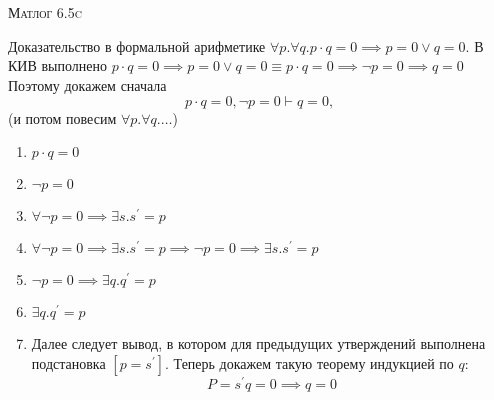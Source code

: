 \documentclass[10pt]{article}
\begin{document}
\def\chap#1#2{\ \\ {\large\bf#1 \ | \ \tt\scshape#2} \par}

\ \vspace{-1cm}

{\bf
\ \\
\Large\centerline{\scshape Матлог 6.5c}
}\normalsize



Доказательство в формальной арифметике $\forall p. \forall q. p\cdot q = 0 \implies p = 0 \lor q = 0$.
В КИВ выполнено $p\cdot q = 0 \implies p = 0 \lor q = 0 \equiv p \cdot q = 0 \implies \neg p = 0 \implies q = 0$
Поэтому докажем сначала 
\[ p \cdot q = 0, \neg p = 0 \vdash q = 0,\]
(и потом повесим $\forall p. \forall q. \ldots$)

\begin{enumerate}
    \item $p\cdot q = 0$
    \item $\neg p = 0$
    \item $\forall \neg p = 0 \implies \exists s. s^\prime = p$
    \item $\forall \neg p = 0 \implies \exists s. s^\prime = p \implies \neg p = 0 \implies \exists s. s^\prime = p$
    \item $\neg p = 0 \implies \exists q. q^\prime = p$
    \item $\exists q. q^\prime = p$
    \item[] Далее следует вывод, в котором для предыдущих утверждений выполнена подстановка $[p = s^\prime]$. Теперь докажем такую теорему индукцией по $q$: 
    \[ P = s^\prime q = 0 \implies q = 0\] 
    

\end{enumerate}
\end{document}
